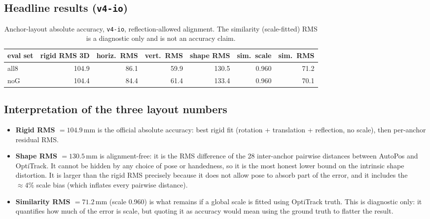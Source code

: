 \documentclass[11pt,a4paper]{article}
\newcommand{\mm}{\,\si{\milli\meter}}
\begin{document}
\subsection{Headline results (\texttt{v4-io})}
\begin{table}[h]
\centering
\caption{Anchor-layout absolute accuracy, \texttt{v4-io}, reflection-allowed alignment.
The similarity (scale-fitted) RMS is a diagnostic only and is not an accuracy claim.}
\begin{tabular}{lrrrrrr}
\toprule
eval set & rigid RMS 3D & horiz.\ RMS & vert.\ RMS & shape RMS & sim.\ scale & sim.\ RMS \\
\midrule
all8 & 104.9 & 86.1 & 59.9 & 130.5 & 0.960 & 71.2 \\
noG  & 104.4 & 84.4 & 61.4 & 133.4 & 0.960 & 70.1 \\
\bottomrule
\end{tabular}
\end{table}

\subsection{Interpretation of the three layout numbers}
\begin{itemize}[leftmargin=1.4em]
  \item \textbf{Rigid RMS $=104.9\mm$} is the official absolute accuracy: best rigid fit
        (rotation + translation + reflection, no scale), then per-anchor residual RMS.
  \item \textbf{Shape RMS $=130.5\mm$} is alignment-free: it is the RMS difference of the 28
        inter-anchor pairwise distances between AutoPos and OptiTrack. It cannot be hidden by
        any choice of pose or handedness, so it is the most honest lower bound on the
        intrinsic shape distortion. It is larger than the rigid RMS precisely because it does
        not allow pose to absorb part of the error, and it includes the $\approx\!4\%$ scale
        bias (which inflates every pairwise distance).
  \item \textbf{Similarity RMS $=71.2\mm$} (scale 0.960) is what remains if a global scale is
        fitted using OptiTrack truth. This is diagnostic only: it quantifies how much of the
        error is scale, but quoting it as accuracy would mean using the ground truth to
        flatter the result.
\end{itemize}
\end{document}
